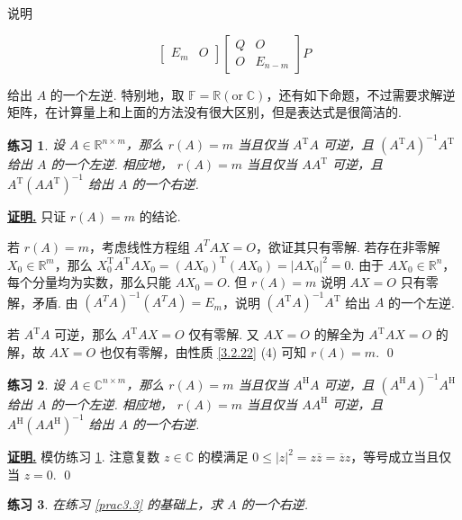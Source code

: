 \documentclass[10pt,openany]{article}
\theoremstyle{thmstyle} %
\newtheorem{practice}{练习}[section]
\theoremstyle{defstyle} %
\theoremstyle{prostyle} %
\theoremstyle{exastyle}
\theoremstyle{remstyle}
\renewenvironment{proof}[1][证明]{\par\underline{\textbf{#1.}} \;\fangsong}{\qed\par}
\newcommand{\T}{^{\text{T}}}
\newcommand{\Her}{^{\text{H}}}
\newcommand{\F}{\mathbb{F}}
\newcommand{\C}{\mathbb{C}}
\newcommand{\R}{\mathbb{R}}
\newcommand{\nm}{^{n \times m}}
\begin{document}
说明

\[ \begin{bmatrix}
	E_m & O
\end{bmatrix}\begin{bmatrix}
	Q & O \\
	O & E_{n-m}
\end{bmatrix}P \]


给出 \( A \) 的一个左逆. 特别地，取 \( \F=\R ( \text{or} \; \C) \)，还有如下命题，不过需要求解逆矩阵，在计算量上和上面的方法没有很大区别，但是表达式是很简洁的.

\begin{practice} \label{prac3.13}
	设 \( A \in \R\nm \)，那么 \( r(A)=m \) 当且仅当 \( A\T A \) 可逆，且 \( (A\T A)^{-1} A\T \) 给出 \( A \) 的一个左逆. 相应地， \( r(A)=m \) 当且仅当 \( AA\T  \) 可逆，且 \( A\T(AA\T)^{-1}  \) 给出 \( A \) 的一个右逆.
\end{practice} 

\begin{proof}
	只证 \( r(A)=m \) 的结论. 
	
	若 \( r(A)=m \)，考虑线性方程组 \( A^TAX=O \)，欲证其只有零解. 若存在非零解 \( X_0 \in \R^m \)，那么 \( X_0\T A\T AX_0= (AX_0)\T (AX_0)=|AX_0|^2=0 \). {\color{red} 由于 \( AX_0 \in \R^n \)，每个分量均为实数，}那么只能 \( AX_0=O \). 但 \( r(A)=m \) 说明 \( AX=O \) 只有零解，矛盾. 由 \( (A^TA)^{-1}(A^TA)=E_m \)，说明 \( (A\T A)^{-1} A\T \) 给出 \( A \) 的一个左逆. 
	
	若 \( A\T A \) 可逆，那么 \( A\T AX=O \) 仅有零解. 又 \( AX=O \) 的解全为 \( A\T AX=O \) 的解，故 \( AX=O \) 也仅有零解，由性质 \ref{3.2.22} (4) 可知 \( r(A)=m \).
\end{proof}

\begin{practice} 
	设 \( A \in \C\nm \)，那么 \( r(A)=m \) 当且仅当 \( A\Her A \) 可逆，且 \( (A\Her A)^{-1} A\Her \) 给出 \( A \) 的一个左逆. 相应地， \( r(A)=m \) 当且仅当 \( AA\Her  \) 可逆，且 \( A\Her(AA\Her)^{-1}  \) 给出 \( A \) 的一个右逆.
\end{practice} 

\begin{proof}
	模仿练习 \ref{prac3.13}. 注意复数 \( z \in \C \) 的模满足 \( 0 \leq |z|^2=z\overline{z}=\overline{z}z  \)，等号成立当且仅当 \( z=0 \).
\end{proof}

\begin{practice}
	在练习 \ref{prac3.3} 的基础上，求 \( A \) 的一个右逆.
\end{practice}
\end{document}

